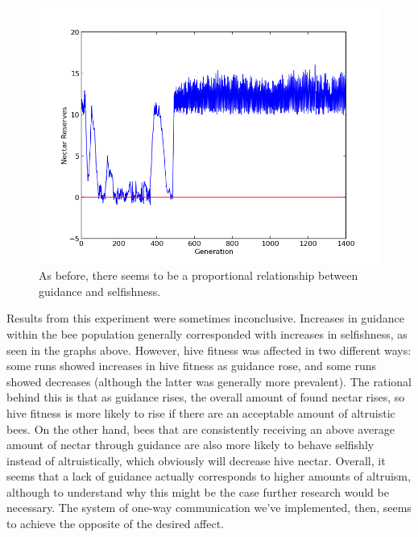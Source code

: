 \documentclass[11pt]{article}
\begin{document}
			\begin{figure}[tb]
				\begin{center}
					\includegraphics[scale=.75]{results/gossip_alt_res.png}
				\end{center}
                \caption{As before, there seems to be a proportional relationship between guidance and selfishness.}
				\label{fig:recurrent_reserves}
			\end{figure}


			Results from this experiment were sometimes inconclusive. Increases in guidance within the bee population generally corresponded with increases in selfishness, as seen in the graphs above.  However, hive fitness was affected in two different ways: some runs showed increases in hive fitness as guidance rose, and some runs showed decreases (although the latter was generally more prevalent). The rational behind this is that as guidance rises, the overall amount of found nectar rises, so hive fitness is more likely to rise if there are an acceptable amount of altruistic bees. On the other hand, bees that are consistently receiving an above average amount of nectar through guidance are also more likely to behave selfishly instead of altruistically, which obviously will decrease hive nectar. Overall, it seems that a lack of guidance actually corresponds to higher amounts of altruism, although to understand why this might be the case further research would be necessary. The system of one-way communication we've implemented, then, seems to achieve the opposite of the desired affect.

\end{document}
